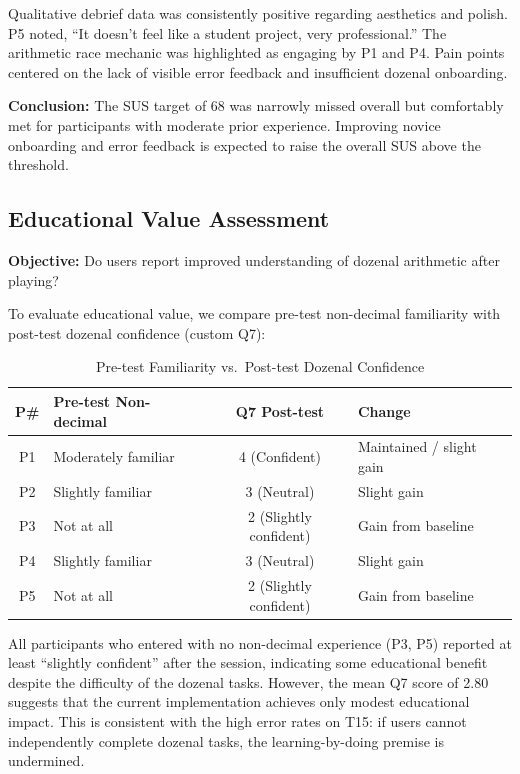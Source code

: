 \documentclass[12pt, titlepage]{article}
\begin{document}
Qualitative debrief data was consistently positive regarding aesthetics and polish. P5 noted, ``It doesn't feel like a student project, very professional.'' The arithmetic race mechanic was highlighted as engaging by P1 and P4. Pain points centered on the lack of visible error feedback and insufficient dozenal onboarding.

\textbf{Conclusion:} The SUS target of 68 was narrowly missed overall but comfortably met for participants with moderate prior experience. Improving novice onboarding and error feedback is expected to raise the overall SUS above the threshold.

\subsection{Educational Value Assessment}

\textbf{Objective:} Do users report improved understanding of dozenal arithmetic after playing?

To evaluate educational value, we compare pre-test non-decimal familiarity with post-test dozenal confidence (custom Q7):

\begin{table}[H]
\centering
\caption{Pre-test Familiarity vs.\ Post-test Dozenal Confidence}
\begin{tabular}{c l c l}
\toprule
\textbf{P\#} & \textbf{Pre-test Non-decimal} & \textbf{Q7 Post-test} & \textbf{Change} \\
\midrule
P1 & Moderately familiar & 4 (Confident) & Maintained / slight gain \\
P2 & Slightly familiar & 3 (Neutral) & Slight gain \\
P3 & Not at all & 2 (Slightly confident) & Gain from baseline \\
P4 & Slightly familiar & 3 (Neutral) & Slight gain \\
P5 & Not at all & 2 (Slightly confident) & Gain from baseline \\
\bottomrule
\end{tabular}
\end{table}

All participants who entered with no non-decimal experience (P3, P5) reported at least ``slightly confident'' after the session, indicating some educational benefit despite the difficulty of the dozenal tasks. However, the mean Q7 score of 2.80 suggests that the current implementation achieves only modest educational impact. This is consistent with the high error rates on T15: if users cannot independently complete dozenal tasks, the learning-by-doing premise is undermined.
\end{document}
